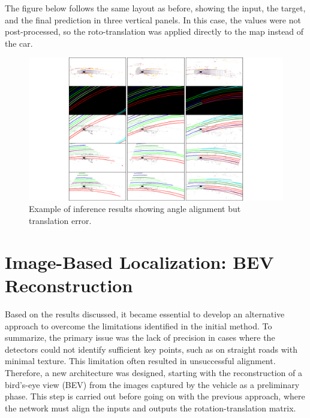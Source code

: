 The figure below follows the same layout as before, showing the input, the target, and the final prediction in three vertical panels. In this case, the values were not post-processed, so the roto-translation was applied directly to the map instead of the car.
\begin{figure}[H]
    \centering
    \includegraphics[width=1\linewidth]{Untitled 2.pdf}
    \caption{Example of inference results showing angle alignment but translation error.}
    \label{fig:inference-results}
\end{figure}

\section{Image-Based Localization: BEV Reconstruction}

Based on the results discussed, it became essential to develop an alternative approach to overcome the limitations identified in the initial method. To summarize, the primary issue was the lack of precision in cases where the detectors could not identify sufficient key points, such as on straight roads with minimal texture. This limitation often resulted in unsuccessful alignment. 
Therefore, a new architecture was designed, starting with the reconstruction of a bird’s-eye view (BEV) from the images captured by the vehicle as a preliminary phase. This step is carried out before going on with the previous approach, where the network must align the inputs and outputs the rotation-translation matrix.

